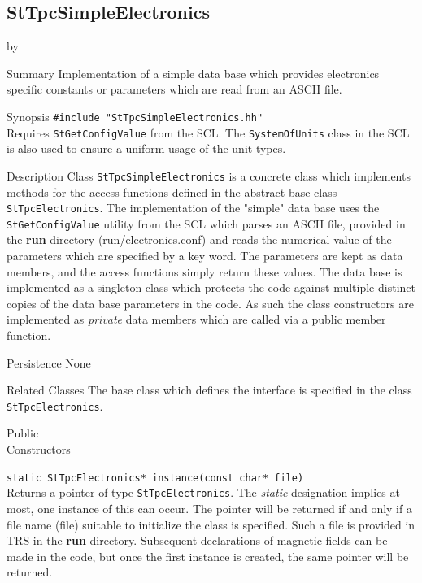 \documentclass[twoside]{article}
\newcommand{\comp}[1]{\texttt{#1}}%
\newcommand{\entrylabel}[1]{\mbox{\textbf{{#1}}}\hfil}%
\newenvironment{entry}
{\begin{list}{}%
    {\renewcommand{\makelabel}{\entrylabel}%
     \setlength{\labelwidth}{90pt}%
     \setlength{\leftmargin}{\labelwidth}
     \advance\leftmargin by \labelsep%
      }%
    }%
  {\end{list}}
\newcommand{\Entrylabel}[1]%
{\raisebox{0pt}[1ex][0pt]{\makebox[\labelwidth][l]%
    {\parbox[t]{\labelwidth}{\hspace{0pt}\textbf{{#1}}}}}}
\newenvironment{Entry}%
{\renewcommand{\entrylabel}{\Entrylabel}\begin{entry}}%
  {\end{entry}}
\begin{document}
%
%
\subsection{StTpcSimpleElectronics} 
\label{sec:stTpcsimpleElectronics}
\begin{Entry}
\item[Summary]
  Implementation of a simple data base which provides electronics 
  specific constants or parameters which are read from an ASCII
  file.      

\item[Synopsis]
  \verb+#include "StTpcSimpleElectronics.hh"+\\
  Requires \comp{StGetConfigValue} from the SCL. 
  The \comp{SystemOfUnits} class in the SCL is also used to
  ensure a uniform usage of the unit types.
  
\item[Description]
Class \comp{StTpcSimpleElectronics} is a concrete class which implements
methods for the access functions defined in the abstract base class 
\comp{StTpcElectronics}.  The implementation of the "simple" data base 
uses the \comp{StGetConfigValue}
utility from the SCL which parses an ASCII file, provided
in the {\bf run} directory (run/electronics.conf) and reads the
numerical value of the parameters which are specified by a key word.  
The parameters are kept as data members, and the access functions
simply return these values.   The data base is implemented as a singleton class 
  which protects the code against multiple distinct copies of the
  data base parameters in the code.  As such the class constructors
  are implemented as {\em private} data members which are called
  via a public member function.
  
\item[Persistence]
   None

\item[Related Classes]
The base class which defines the interface is specified in
the class \\ \comp{StTpcElectronics}.

\item[Public \\ Constructors]

   \verb+static StTpcElectronics* instance(const char* file)+\\
   Returns a pointer of type \comp{StTpcElectronics}.  The {\em static}
   designation implies at most, one instance of this can occur.
   The pointer will be returned if and only if a file name (file) 
   suitable to initialize the class is specified.  Such a file
   is provided in TRS in the {\bf run} directory.  Subsequent 
   declarations of magnetic fields can be made in the code, but
   once the first instance is created, the same pointer will
   be returned.


\end{Entry}
\end{document}

